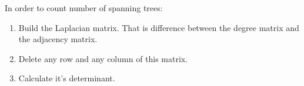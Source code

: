 In order to count number of spanning trees:
\begin{enumerate}
	\item Build the Laplacian matrix. That is difference between the degree matrix and the adjacency matrix.
	\item Delete any row and any column of this matrix.
	\item Calculate it's determinant.
\end{enumerate}